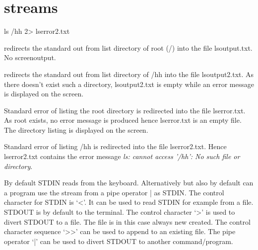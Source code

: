 \documentclass[a4paper,11pt,twoside]{article}
\begin{document}
\section{streams}
\begin{labeling}{ls /hh 2> lserror2.txt}
\item [ls / < lsoutput.txt] redirects the standard out from list directory of root (/) into the file lsoutput.txt. No screenoutput.
\item [ls /hh > lsoutput2.txt] redirects the standard out from list directory of /hh into the file lsoutput2.txt. As there doesn't exist such a directory, lsoutput2.txt is empty while an error message is displayed on the screen.
\item [ls / 2> lserror.txt] Standard error of listing the root directory is redirected into the file lserror.txt. As root exists, no error message is produced hence lserror.txt is an empty file. The directory listing is displayed on the screen.
\item [ls /hh 2> lserror2.txt] Standard error of listing /hh is redirected into the file lserror2.txt. Hence lserror2.txt contains the error message \textit{ls: cannot access '/hh': No such file or directory}.
\end{labeling}

By default STDIN reads from the keyboard. Alternatively but also by default can a program use the stream from a pipe operator | as STDIN. The control character for STDIN is `<'. It can be used to read STDIN for example from a file. STDOUT is by default to the terminal. The control character `>' is used to divert STDOUT to a file. The file is in this case always new created. The control character sequence `>>' can be used to append to an existing file. The pipe operator `|' can be used to divert STDOUT to another command/program. 


%
\end{document}
